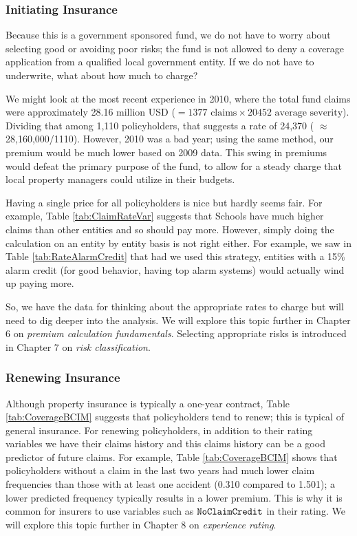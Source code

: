 \documentclass[]{book}
\theoremstyle{definition}
\theoremstyle{definition}
\theoremstyle{definition}
\theoremstyle{remark}
\begin{document}
\subsubsection*{Initiating Insurance}\label{initiating-insurance-1}

Because this is a government sponsored fund, we do not have to worry
about selecting good or avoiding poor risks; the fund is not allowed to
deny a coverage application from a qualified local government entity. If
we do not have to underwrite, what about how much to charge?

We might look at the most recent experience in 2010, where the total
fund claims were approximately 28.16 million USD
(\(=1377 \text{ claims} \times 20452 \text{ average severity}\)).
Dividing that among 1,110 policyholders, that suggests a rate of 24,370
( \(\approx\) 28,160,000/1110). However, 2010 was a bad year; using the
same method, our premium would be much lower based on 2009 data. This
swing in premiums would defeat the primary purpose of the fund, to allow
for a steady charge that local property managers could utilize in their
budgets.

Having a single price for all policyholders is nice but hardly seems
fair. For example, Table \ref{tab:ClaimRateVar} suggests that Schools
have much higher claims than other entities and so should pay more.
However, simply doing the calculation on an entity by entity basis is
not right either. For example, we saw in Table \ref{tab:RateAlarmCredit}
that had we used this strategy, entities with a 15\% alarm credit (for
good behavior, having top alarm systems) would actually wind up paying
more.

So, we have the data for thinking about the appropriate rates to charge
but will need to dig deeper into the analysis. We will explore this
topic further in Chapter 6 on \emph{premium calculation fundamentals}.
Selecting appropriate risks is introduced in Chapter 7 on \emph{risk
classification}.

\subsubsection*{Renewing Insurance}\label{renewing-insurance-1}

Although property insurance is typically a one-year contract, Table
\ref{tab:CoverageBCIM} suggests that policyholders tend to renew; this
is typical of general insurance. For renewing policyholders, in addition
to their rating variables we have their claims history and this claims
history can be a good predictor of future claims. For example, Table
\ref{tab:CoverageBCIM} shows that policyholders without a claim in the
last two years had much lower claim frequencies than those with at least
one accident (0.310 compared to 1.501); a lower predicted frequency
typically results in a lower premium. This is why it is common for
insurers to use variables such as \({\tt NoClaimCredit}\) in their
rating. We will explore this topic further in Chapter 8 on
\emph{experience rating}.
\end{document}
